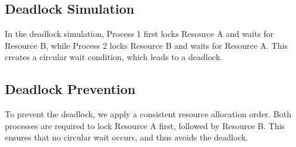 \documentclass[12pt]{article}
\begin{document}
\subsection*{Deadlock Simulation}

In the deadlock simulation, Process 1 first locks Resource A and waits for Resource B, while Process 2 locks Resource B and waits for Resource A. This creates a circular wait condition, which leads to a deadlock.

\subsection*{Deadlock Prevention}

To prevent the deadlock, we apply a consistent resource allocation order. Both processes are required to lock Resource A first, followed by Resource B. This ensures that no circular wait occurs, and thus avoids the deadlock.\vspace{10pt}

\end{document}

